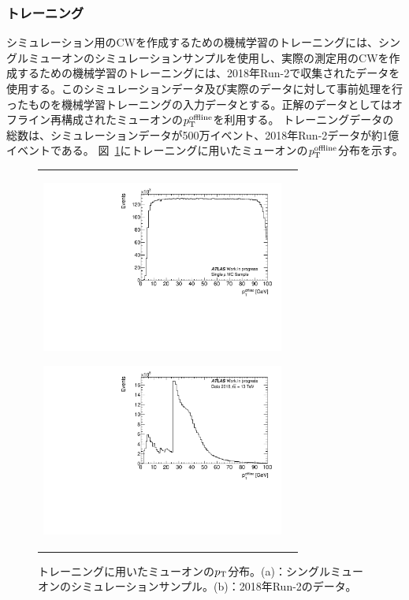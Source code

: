 \subsubsection{トレーニング}
シミュレーション用のCWを作成するための機械学習のトレーニングには、シングルミューオンのシミュレーションサンプルを使用し、実際の測定用のCWを作成するための機械学習のトレーニングには、2018年Run-2で収集されたデータを使用する。このシミュレーションデータ及び実際のデータに対して事前処理を行ったものを機械学習トレーニングの入力データとする。正解のデータとしてはオフライン再構成されたミューオンの$p_{\rm{T}}^{\rm{offline}}$を利用する。
トレーニングデータの総数は、シミュレーションデータが500万イベント、2018年Run-2データが約1億イベントである。
図~\ref{Inputdata}にトレーニングに用いたミューオンの$p_{\rm{T}}^{\rm{offline}}$分布を示す。
\begin{figure}
    \begin{tabular}{cc}
    \centering
    \begin{minipage}[b]{0.45\hsize}%
        \centering
        \hspace*{-1.5cm}
        \includegraphics[clip, width=8cm]{fig/4/MC_input_pt100.pdf}
        \subcaption{}
        \label{MC_input}
    \end{minipage}%
    \begin{minipage}[b]{0.65\hsize}%
        \centering
        \hspace*{-1cm}
        \includegraphics[clip, width=8cm]{fig/4/Data_input_pt.pdf}
        \subcaption{}
        \label{Data_input}
    \end{minipage}%
    \end{tabular}
    \caption{トレーニングに用いたミューオンの$p_{\rm{T}}$分布。(a)：シングルミューオンのシミュレーションサンプル。(b)：2018年Run-2のデータ。}
    \label{Inputdata}
\end{figure}

